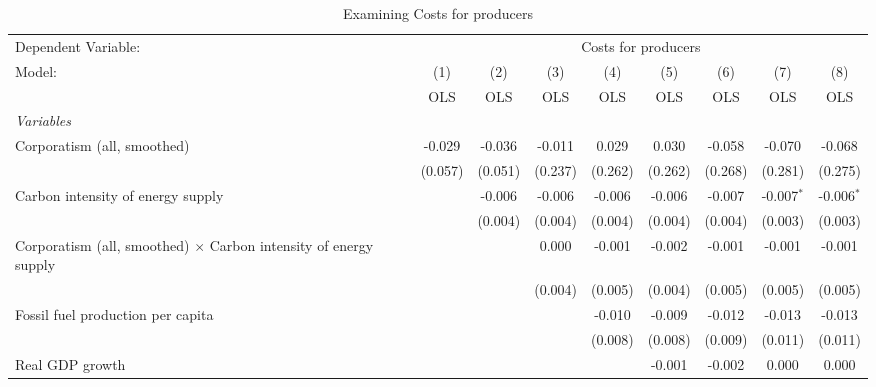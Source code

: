 
\begin{table}[htbp]
   \caption{Examining Costs for producers}
   \centering
   \begin{tabular}{lcccccccc}
      \toprule
      Dependent Variable: & \multicolumn{8}{c}{Costs for producers}\\
      Model:                                                                  & (1)     & (2)     & (3)     & (4)     & (5)     & (6)     & (7)          & (8)\\  
                                                                              &  OLS    & OLS     & OLS     & OLS     & OLS     & OLS     & OLS          & OLS\\  
      \midrule
      \emph{Variables}\\
      Corporatism (all, smoothed)                                             & -0.029  & -0.036  & -0.011  & 0.029   & 0.030   & -0.058  & -0.070       & -0.068\\   
                                                                              & (0.057) & (0.051) & (0.237) & (0.262) & (0.262) & (0.268) & (0.281)      & (0.275)\\   
      Carbon intensity of energy supply                                       &         & -0.006  & -0.006  & -0.006  & -0.006  & -0.007  & -0.007$^{*}$ & -0.006$^{*}$\\   
                                                                              &         & (0.004) & (0.004) & (0.004) & (0.004) & (0.004) & (0.003)      & (0.003)\\   
      Corporatism (all, smoothed) $\times$ Carbon intensity of energy supply  &         &         & 0.000   & -0.001  & -0.002  & -0.001  & -0.001       & -0.001\\   
                                                                              &         &         & (0.004) & (0.005) & (0.004) & (0.005) & (0.005)      & (0.005)\\   
      Fossil fuel production per capita                                       &         &         &         & -0.010  & -0.009  & -0.012  & -0.013       & -0.013\\   
                                                                              &         &         &         & (0.008) & (0.008) & (0.009) & (0.011)      & (0.011)\\   
      Real GDP growth                                                         &         &         &         &         & -0.001  & -0.002  & 0.000        & 0.000\\   

\end{tabular}
\end{table}
